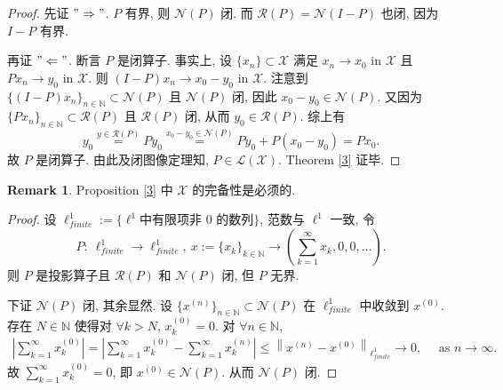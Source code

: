 \documentclass[a4paper,11pt]{article}
\theoremstyle{definition}
\newtheorem{remark}[theorem]{Remark}
\begin{document}
\begin{CJK*}{UTF8}{gbsn}
\begin{proof}
    先证 $ "\Rightarrow" $. $ P $ 有界, 则 $ \mathcal{N}(P) $ 闭.
    而 $ \mathcal{R}(P) = \mathcal{N}(I-P) $ 也闭, 因为 $ I-P $ 有界.
    
    再证 $ "\Leftarrow" $. 
    断言 $ P $ 是闭算子. 事实上, 设 $ \{x_n\} \subset \mathcal{X} $ 满足 $ x_n \to x_0 \text{ in } \mathcal{X} $ 且 
    $ P x_n \to y_0 \text{ in } \mathcal{X} $.
    则 $ (I - P) x_n \to x_0 - y_0 \text{ in } \mathcal{X} $.
    注意到 $ \{(I - P) x_n\}_{n \in \mathbb{N}} \subset \mathcal{N}(P) $ 且 $ \mathcal{N}(P) $ 闭,
    因此 $ x_0 - y_0 \in \mathcal{N}(P) $. 
    又因为 $ \{P x_n\}_{n \in \mathbb{N}} \subset \mathcal{R}(P) $ 且 $ \mathcal{R}(P) $ 闭,
    从而 $ y_0 \in \mathcal{R}(P) $. 综上有
    $$
        y_0 \overset{y \in \mathcal{R}(P)}{=} Py_0
          \overset{x_0 - y_0 \in \mathcal{N}(P)}{=} Py_0 + P(x_0 - y_0)
          = Px_0.
    $$
    故 $ P $ 是闭算子. 由此及闭图像定理知, $ P \in \mathscr{L}(\mathcal{X}) $. Theorem \ref{3} 证毕.
\end{proof}

\begin{remark}
    Proposition \ref{3} 中 $ \mathcal{X} $ 的完备性是必须的.
\end{remark}

\begin{proof}
    设 $ \ell_{finite}^1 := \{ \ell^1 \text{中有限项非 0 的数列} \} $, 范数与 $ \ell^1 $ 一致, 令
    $$
        P :\ \ell_{finite}^1 \to \ell_{finite}^1,\ 
            x:= \{x_k\}_{k \in \mathbb{N}} \to \left( \sum_{k = 1}^\infty x_k, 0, 0, \ldots \right).
    $$
    则 $ P $ 是投影算子且 $ \mathcal{R}(P) $ 和 $ \mathcal{N}(P) $ 闭, 但 $ P $ 无界. 
    
    下证 $ \mathcal{N}(P) $ 闭, 其余显然.
    设 $ \{x^{(n)}\}_{n \in \mathbb{N}} \subset \mathcal{N}(P) $ 在 $ \ell_{finite}^1 $ 中收敛到 $ x^{(0)} $.
    存在 $ N \in \mathbb{N} $ 使得对 $ \forall k > N $, $ x^{(0)}_k = 0 $.
    对 $ \forall n \in \mathbb{N} $,
    \begin{align*}
        \left| \sum_{k = 1}^\infty x^{(0)}_k \right|
            = \left| \sum_{k = 1}^\infty x^{(0)}_k - \sum_{k = 1}^\infty x^{(n)}_k \right| 
            \leq \left\| x^{(n)} - x^{(0)} \right\|_{\ell_{finite}^1}
            \to 0, \quad \text{ as } n \to \infty.
    \end{align*}
    故 $ \sum_{k = 1}^\infty x^{(0)}_k = 0 $, 即 $ x^{(0)} \in \mathcal{N}(P) $.
    从而 $ \mathcal{N}(P) $ 闭.
\end{proof}


\end{CJK*}
\end{document}

